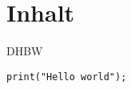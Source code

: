\section{Inhalt}

\ac{DHBW} \cite{BookKey} \cite{OnlineKey} 

\begin{lstlisting}
print("Hello world");
\end{lstlisting}
